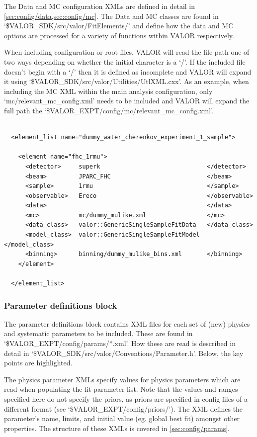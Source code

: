 The Data and MC configuration XMLs are defined in detail in \cref{sec:config/data,sec:config/mc}. The Data and MC classes are found in `\$VALOR\_SDK/src/valor/FitElements/' and define how the data and MC options are processed for a variety of functions within VALOR respectively.

When including configuration or root files, VALOR will read the file path one of two ways depending on whether the initial character is a `/'. If the included file doesn't begin with a `/' then it is defined as incomplete and VALOR will expand it using `\$VALOR\_SDK/src/valor/Utilities/UtlXML.cxx'. As an example, when including the MC XML within the main analysis configuration, only `mc/relevant\_mc\_config.xml' needs to be included and VALOR will expand the full path the `\$VALOR\_EXPT/config/mc/relevant\_mc\_config.xml'.

{\color{capri}
\begin{verbatim}

  <element_list name="dummy_water_cherenkov_experiment_1_sample">

    <element name="fhc_1rmu">
      <detector>     superk                              </detector>
      <beam>         JPARC_FHC                           </beam>
      <sample>       1rmu                                </sample>
      <observable>   Ereco                               </observable>
      <data>                                             </data>
      <mc>           mc/dummy_mulike.xml                 </mc>           
      <data_class>   valor::GenericSingleSampleFitData   </data_class>
      <model_class>  valor::GenericSingleSampleFitModel  </model_class>
      <binning>      binning/dummy_mulike_bins.xml       </binning>      
    </element>

  </element_list>

\end{verbatim}
}

\subsubsection{Parameter definitions block}

The parameter definitions block contains XML files for each set of (new) physics and systematic parameters to be included. These are found in `\$VALOR\_EXPT/config/params/*.xml'. How these are read is described in detail in `\$VALOR\_SDK/src/valor/Conventions/Parameter.h'. Below, the key points are highlighted.

The physics parameter XMLs specify values for physics parameters which are read when populating the fit parameter list. Note that the values and ranges specified here do not specify the priors, as priors are specified in config files of a different format (see `\$VALOR\_EXPT/config/priors/'). The XML defines the parameter's name, limits, and initial value (eg. global best fit) amongst other properties. The structure of these XMLs is covered in \cref{sec:config/params}.

